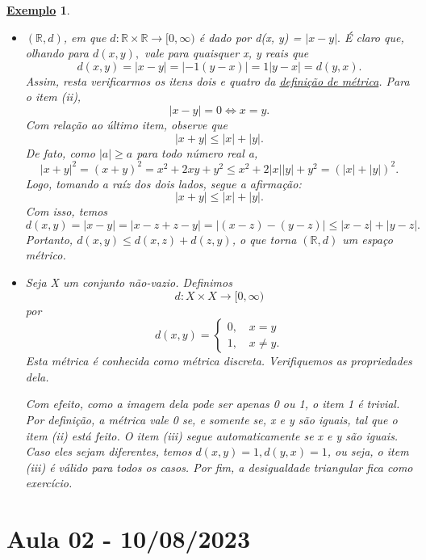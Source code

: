 \documentclass{article}
\newtheorem{example}{\underline{Exemplo}}
\begin{document}
\begin{example}
 \begin{itemize}
   
   \item[1)] \((\mathbb{R}, d)\), em que \(d:\mathbb{R}\times \mathbb{R}\rightarrow [0, \infty)\) é dado por 
    d(x, y) = \(|x-y|.\) É claro que, olhando para \(d(x,y),\) vale para quaisquer x, y reais que 
      \[
        d(x, y) = |x-y| = |-1(y-x)| = 1|y-x| = d(y, x).
      \]
    Assim, resta verificarmos os itens dois e quatro da \hyperlink{def_metric}{definição de métrica}. Para o item (ii), 
    \[
      |x-y| = 0 \Longleftrightarrow x = y.
    \]
    Com relação ao último item, observe que 
    \[
      |x+y|\leq |x| + |y|.
    \]
    De fato, como \(|a|\geq a\) para todo número real a, 
    \[
      |x+y|^{2} = (x+y)^{2} = x^{2} + 2xy +y^{2}\leq x^{2} + 2|x||y| + y^{2} = (|x| + |y|)^{2}.
    \]
    Logo, tomando a raíz dos dois lados, segue a afirmação:
    \[
        |x+y|\leq |x| + |y|.
    \]
    Com isso, temos 
      \[
        d(x, y) = |x-y| = |x-z+z-y| = |(x-z)-(y-z)|\leq |x-z| + |y-z|.
      \]
    Portanto, \(d(x, y)\leq d(x, z) + d(z, y)\), o que torna \((\mathbb{R}, d)\) um espaço métrico.

    \item[2)] Seja X um conjunto não-vazio. Definimos 
      \[
        d:X\times X\rightarrow [0, \infty)
      \]
      por 
        \[
          d(x, y) = \left\{\begin{array}{ll}
              0,\quad x = y\\
              1,\quad x\neq y.
            \end{array}\right.
        \]
      Esta métrica é conhecida como \textit{métrica discreta}. Verifiquemos as propriedades dela.

Com efeito, como a imagem dela pode ser apenas 0 ou 1, o item 1 é trivial. Por definição, a métrica vale 0 se,
e somente se, x e y são iguais, tal que o item (ii) está feito. O item (iii) segue automaticamente se x e y são iguais. Caso
eles sejam diferentes, temos \(d(x, y) = 1, d(y, x) = 1\), ou seja, o item (iii) é válido para todos os casos. Por fim, a desigualdade triangular fica como exercício.
 \end{itemize} 
\end{example}
\newpage

\section{Aula 02 - 10/08/2023}
\end{document}
